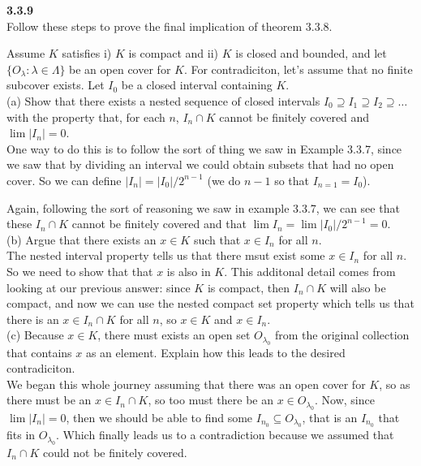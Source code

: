 \label{abbott:3.3.9}
\textbf{3.3.9}
\\

Follow these steps to prove the final implication of theorem 3.3.8.

Assume $K$ satisfies i) $K$ is compact and ii) $K$ is closed and bounded, and let
$\{ O_\lambda : \lambda \in \Lambda \}$ be an open cover for $K$.
For contradiciton, let's assume that no finite subcover exists.
Let $I_0$ be a closed interval containing $K$.
\\

(a) Show that there exists a nested sequence of closed intervals $I_0 \supseteq I_1 \supseteq I_2 \supseteq \ldots$
with the property that, for each $n$, $I_n \cap K$ cannot be finitely covered and $\lim |I_n| = 0$.
\\

One way to do this is to follow the sort of thing we saw in Example 3.3.7, since we saw that by dividing an
interval we could obtain subsets that had no open cover.
So we can define $|I_n| = |I_0| / 2^{n-1}$ (we do $n-1$ so that $I_{n=1} = I_0$).

Again, following the sort of reasoning we saw in example 3.3.7, we can see that these $I_n \cap K$ cannot be finitely
covered and that $\lim I_n = \lim |I_0|/2^{n-1} = 0$.
\\

(b) Argue that there exists an $x\in K$ such that $x \in I_n$ for all $n$.
\\

The nested interval property tells us that there msut exist some $x \in I_n$ for all $n$.
So we need to show that that $x$ is also in $K$.
This additonal detail comes from looking at our previous answer: since $K$ is compact, then $I_n \cap K$
will also be compact, and now we can use the nested compact set property which tells us that
there is an $x \in I_n \cap K$ for all $n$, so $x\in K$ and $x\in I_n$.
\\

(c) Because $x\in K$, there must exists an open set $O_{\lambda_0}$ from the original collection that
contains $x$ as an element.
Explain how this leads to the desired contradiciton.
\\

We began this whole journey assuming that there was an open cover for $K$, so as there must be an
$x \in I_n \cap K$, so too must there be an $x \in O_{\lambda_0}$.
Now, since $\lim |I_n| = 0$, then we should be able to find some $I_{n_0} \subseteq O_{\lambda_0}$,
that is an $I_{n_0}$ that fits in $O_{\lambda_0}$.
Which finally leads us to a contradiction because we assumed that $I_n \cap K$ could not be finitely covered.
\\~\\




